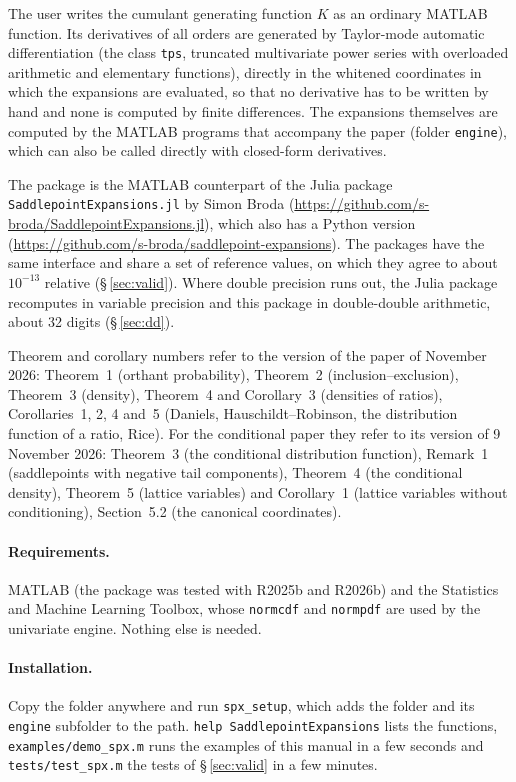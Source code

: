 \documentclass[11pt]{article}
\newcommand{\prog}[1]{\texttt{#1}}
\begin{document}
The user writes the cumulant generating function $K$ as an ordinary MATLAB function. Its
derivatives of all orders are generated by Taylor-mode automatic differentiation (the class
\prog{tps}, truncated multivariate power series with overloaded arithmetic and elementary
functions), directly in the whitened coordinates in which the expansions are evaluated, so that no
derivative has to be written by hand and none is computed by finite differences. The expansions
themselves are computed by the MATLAB programs that accompany the paper (folder \prog{engine}),
which can also be called directly with closed-form derivatives.

The package is the MATLAB counterpart of the Julia package \prog{SaddlepointExpansions.jl} by
Simon Broda (\url{https://github.com/s-broda/SaddlepointExpansions.jl}), which also has a Python
version (\url{https://github.com/s-broda/saddlepoint-expansions}). The packages have the same
interface and share a set of reference values, on which they agree to about $10^{-13}$ relative
(\S\,\ref{sec:valid}). Where double precision runs out, the Julia package recomputes in variable precision and this package in double-double arithmetic, about 32 digits (\S\,\ref{sec:dd}).

Theorem and corollary numbers refer to the version of the paper of November 2026: Theorem~1
(orthant probability), Theorem~2 (inclusion--exclusion), Theorem~3 (density), Theorem~4 and
Corollary~3 (densities of ratios), Corollaries~1, 2, 4 and~5 (Daniels, Hauschildt--Robinson, the
distribution function of a ratio, Rice). For the conditional paper they refer to its version of
9 November 2026: Theorem~3 (the conditional distribution function), Remark~1 (saddlepoints with
negative tail components), Theorem~4 (the conditional density), Theorem~5 (lattice variables) and
Corollary~1 (lattice variables without conditioning), Section~5.2 (the canonical coordinates).

\paragraph{Requirements.} MATLAB (the package was tested with R2025b and R2026b) and the
Statistics and Machine Learning Toolbox, whose \prog{normcdf} and \prog{normpdf} are used by the
univariate engine. Nothing else is needed.

\paragraph{Installation.} Copy the folder anywhere and run \prog{spx\_setup}, which adds the folder
and its \prog{engine} subfolder to the path. \prog{help SaddlepointExpansions} lists the functions,
\prog{examples/demo\_spx.m} runs the examples of this manual in a few seconds and
\prog{tests/test\_spx.m} the tests of \S\,\ref{sec:valid} in a few minutes.
\end{document}
